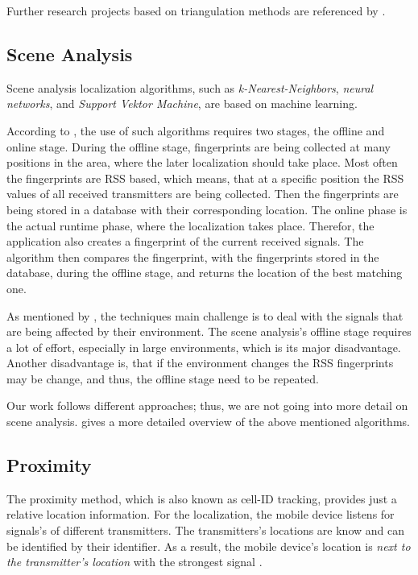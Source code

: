 Further research projects based on triangulation methods are referenced by \citet{IEEE:survey_wireless_indoor_pos}.

\subsection{Scene Analysis}
Scene analysis localization algorithms, such as \emph{k-Nearest-Neighbors}, \emph{neural networks}, and \emph{Support Vektor Machine}, are based on machine learning.

According to \citet{IEEE:survey_wireless_indoor_pos}, the use of such algorithms requires two stages, the offline and online stage. During the offline stage, fingerprints are being collected at many positions in the area, where the later localization should take place. Most often the fingerprints are \acs{RSS} based, which means, that at a specific position the \acs{RSS} values of all received transmitters are being collected. Then the fingerprints are being stored in a database with their corresponding location. The online phase is the actual runtime phase, where the localization takes place. Therefor, the application also creates a fingerprint of the current received signals. The algorithm then compares the fingerprint, with the fingerprints stored in the database, during the offline stage, and returns the location of the best matching one.

As mentioned by \citet{IEEE:survey_wireless_indoor_pos}, the techniques main challenge is to deal with the signals that are being affected by their environment. The scene analysis's offline stage requires a lot of effort, especially in large environments, which is its major disadvantage. Another disadvantage is, that if the environment changes the \acs{RSS} fingerprints may be change, and thus, the offline stage need to be repeated.

Our work follows different approaches; thus, we are not going into more detail on scene analysis. \citet{IEEE:survey_wireless_indoor_pos} gives a more detailed overview of the above mentioned algorithms.


\subsection{Proximity}
The proximity method, which is also known as cell-ID tracking, provides just a relative location information. For the localization, the mobile device listens for signals's of different transmitters. The transmitters's locations are know and can be identified by their identifier. As a result, the mobile device's location is \emph{next to the transmitter's location} with the strongest signal \citep{IEEE:survey_wireless_indoor_pos, wang:bt_pos}.

